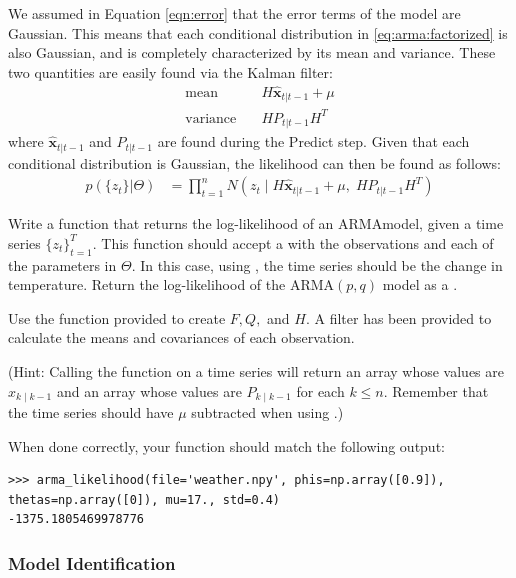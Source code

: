 We assumed in Equation \ref{eqn:error} that the error terms of the model are Gaussian.
This means that each conditional distribution in \ref{eq:arma:factorized} is also Gaussian, and is completely characterized by its mean and variance.
These two quantities are easily found via the Kalman filter:
\begin{align}
    \text{mean} & \quad H\hat{\textbf{x}}_{t|t-1} + \mu \\
    \text{variance} & \quad HP_{t|t-1}H^T
\end{align}
where $\hat{\textbf{x}}_{t|t-1}$ and $P_{t|t-1}$ are found during the Predict step.
Given that each conditional distribution is Gaussian, the likelihood can then be found as follows:
\begin{align}
    \label{eq:arma:likelihood}
    p(\{z_t\} | \Theta)& = \prod_{t=1}^{n} N(z_t\mid H\hat{\textbf{x}}_{t|t-1} + \mu,\;
    HP_{t|t-1}H^T)
\end{align}

\begin{problem}
\label{prob:arma:likelihood}
Write a function  that returns the log-likelihood of an ARMAmodel, given a time series $\{z_t\}_{t=1}^T$.
This function should accept a  with the observations and each of the parameters in $\Theta$. 
In this case, using , the time series should be the change in temperature.
Return the log-likelihood of the $\text{ARMA}(p,q)$ model as a .

Use the  function provided to create $F,Q,$ and $H$.
A  filter has been provided to calculate the means and covariances of each observation.

(Hint: Calling the function  on a time series will return an array whose values are $x_{k\mid k-1}$ and an array whose values are $P_{k\mid k-1}$ for each $k\leq n$.
Remember that the time series should have $\mu$ subtracted when using .)

When done correctly, your function should match the following output:
\begin{lstlisting}
>>> arma_likelihood(file='weather.npy', phis=np.array([0.9]), thetas=np.array([0]), mu=17., std=0.4)
-1375.1805469978776
\end{lstlisting}
\end{problem}

\subsubsection*{Model Identification}

